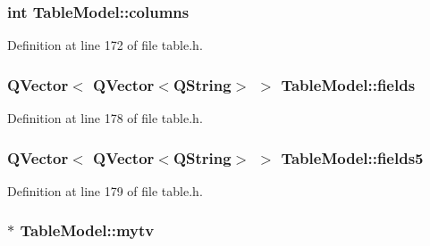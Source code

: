 \hypertarget{classTableModel_a363abf84b86025d76dd5f29c1e255bdd}{
\subsubsection[{columns}]{\setlength{\rightskip}{0pt plus 5cm}int {\bf TableModel::columns}}}
\label{classTableModel_a363abf84b86025d76dd5f29c1e255bdd}


Definition at line 172 of file table.h.

\hypertarget{classTableModel_aa7a971b1dc03dbf0392bb0c77c5a5e85}{
\subsubsection[{fields}]{\setlength{\rightskip}{0pt plus 5cm}QVector$<$ QVector$<$QString$>$ $>$ {\bf TableModel::fields}}}
\label{classTableModel_aa7a971b1dc03dbf0392bb0c77c5a5e85}


Definition at line 178 of file table.h.

\hypertarget{classTableModel_aaba457443a11f6e5e720ffb65b6f7191}{
\subsubsection[{fields5}]{\setlength{\rightskip}{0pt plus 5cm}QVector$<$ QVector$<$QString$>$ $>$ {\bf TableModel::fields5}}}
\label{classTableModel_aaba457443a11f6e5e720ffb65b6f7191}


Definition at line 179 of file table.h.

\hypertarget{classTableModel_a8971dba45716f1d616d51f9363935ace}{
\subsubsection[{mytv}]{$\ast$ {\bf TableModel::mytv}}}
\label{classTableModel_a8971dba45716f1d616d51f9363935ace}


